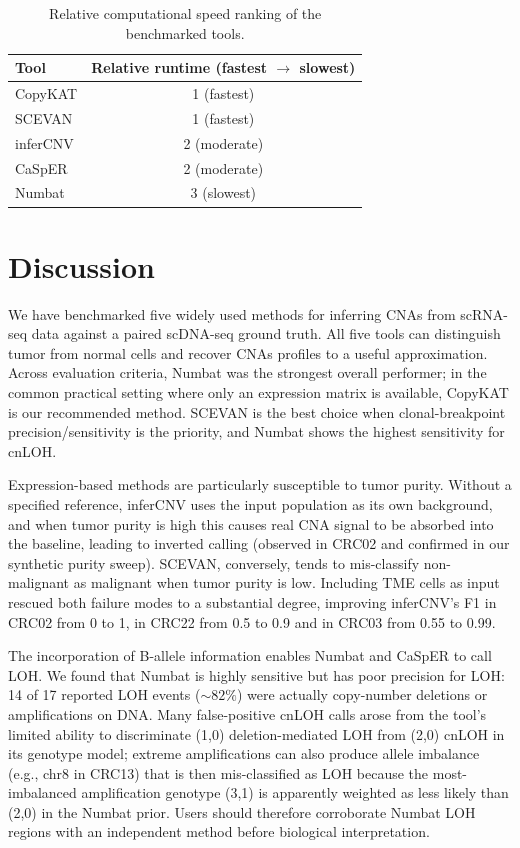 \documentclass[11pt]{article}
\begin{document}
\begin{table}[ht]
\centering
\caption{Relative computational speed ranking of the benchmarked tools.}
\label{tab:runtime}
\begin{tabular}{lc}
\toprule
Tool & Relative runtime (fastest $\rightarrow$ slowest) \\
\midrule
CopyKAT  & 1 (fastest) \\
SCEVAN   & 1 (fastest) \\
inferCNV & 2 (moderate) \\
CaSpER   & 2 (moderate) \\
Numbat   & 3 (slowest) \\
\bottomrule
\end{tabular}
\end{table}

\section{Discussion}

We have benchmarked five widely used methods for inferring CNAs from scRNA-seq data against a paired scDNA-seq ground truth. All five tools can distinguish tumor from normal cells and recover CNAs profiles to a useful approximation. Across evaluation criteria, Numbat was the strongest overall performer; in the common practical setting where only an expression matrix is available, CopyKAT is our recommended method. SCEVAN is the best choice when clonal-breakpoint precision/sensitivity is the priority, and Numbat shows the highest sensitivity for cnLOH.

Expression-based methods are particularly susceptible to tumor purity. Without a specified reference, inferCNV uses the input population as its own background, and when tumor purity is high this causes real CNA signal to be absorbed into the baseline, leading to inverted calling (observed in CRC02 and confirmed in our synthetic purity sweep). SCEVAN, conversely, tends to mis-classify non-malignant as malignant when tumor purity is low. Including TME cells as input rescued both failure modes to a substantial degree, improving inferCNV's F1 in CRC02 from 0 to 1, in CRC22 from 0.5 to 0.9 and in CRC03 from 0.55 to 0.99.

The incorporation of B-allele information enables Numbat and CaSpER to call LOH. We found that Numbat is highly sensitive but has poor precision for LOH: 14 of 17 reported LOH events (${\sim}82\%$) were actually copy-number deletions or amplifications on DNA. Many false-positive cnLOH calls arose from the tool's limited ability to discriminate (1,0) deletion-mediated LOH from (2,0) cnLOH in its genotype model; extreme amplifications can also produce allele imbalance (e.g., chr8 in CRC13) that is then mis-classified as LOH because the most-imbalanced amplification genotype (3,1) is apparently weighted as less likely than (2,0) in the Numbat prior. Users should therefore corroborate Numbat LOH regions with an independent method before biological interpretation.
\end{document}
